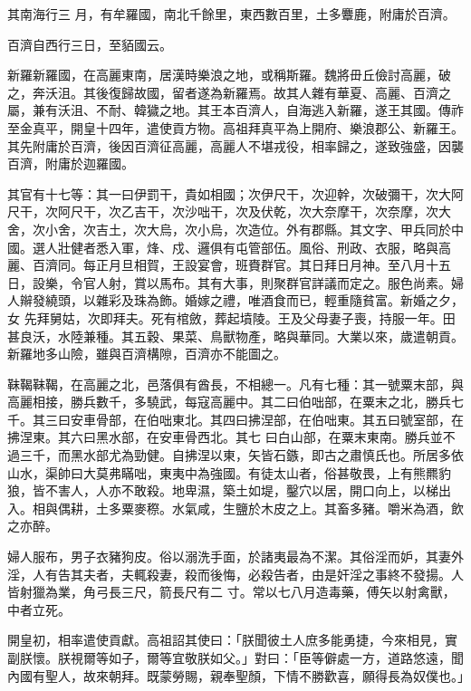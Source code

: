 \begin{pinyinscope}
 其南海行三
 月，有牟羅國，南北千餘里，東西數百里，土多麞鹿，附庸於百濟。



 百濟自西行三日，至貊國云。



 新羅新羅國，在高麗東南，居漢時樂浪之地，或稱斯羅。魏將毌丘儉討高麗，破之，奔沃沮。其後復歸故國，留者遂為新羅焉。故其人雜有華夏、高麗、百濟之屬，兼有沃沮、不耐、韓獩之地。其王本百濟人，自海逃入新羅，遂王其國。傳祚至金真平，開皇十四年，遣使貢方物。高祖拜真平為上開府、樂浪郡公、新羅王。其先附庸於百濟，後因百濟征高麗，高麗人不堪戎役，相率歸之，遂致強盛，因襲
 百濟，附庸於迦羅國。



 其官有十七等：其一曰伊罰干，貴如相國；次伊尺干，次迎幹，次破彌干，次大阿尺干，次阿尺干，次乙吉干，次沙咄干，次及伏乾，次大奈摩干，次奈摩，次大舍，次小舍，次吉土，次大烏，次小烏，次造位。外有郡縣。其文字、甲兵同於中國。選人壯健者悉入軍，烽、戍、邏俱有屯管部伍。風俗、刑政、衣服，略與高麗、百濟同。每正月旦相賀，王設宴會，班賚群官。其日拜日月神。至八月十五日，設樂，令官人射，賞以馬布。其有大事，則聚群官詳議而定之。服色尚素。婦人辮發繞頭，以雜彩及珠為飾。婚嫁之禮，唯酒食而已，輕重隨貧富。新婚之夕，女
 先拜舅姑，次即拜夫。死有棺斂，葬起墳陵。王及父母妻子喪，持服一年。田甚良沃，水陸兼種。其五穀、果菜、鳥獸物產，略與華同。大業以來，歲遣朝貢。新羅地多山險，雖與百濟構隙，百濟亦不能圖之。



 靺鞨靺鞨，在高麗之北，邑落俱有酋長，不相總一。凡有七種：其一號粟末部，與高麗相接，勝兵數千，多驍武，每寇高麗中。其二曰伯咄部，在粟末之北，勝兵七千。其三曰安車骨部，在伯咄東北。其四曰拂涅部，在伯咄東。其五曰號室部，在拂涅東。其六曰黑水部，在安車骨西北。其七
 曰白山部，在粟末東南。勝兵並不過三千，而黑水部尤為勁健。自拂涅以東，矢皆石鏃，即古之肅慎氏也。所居多依山水，渠帥曰大莫弗瞞咄，東夷中為強國。有徒太山者，俗甚敬畏，上有熊羆豹狼，皆不害人，人亦不敢殺。地卑濕，築土如堤，鑿穴以居，開口向上，以梯出入。相與偶耕，土多粟麥穄。水氣咸，生鹽於木皮之上。其畜多豬。嚼米為酒，飲之亦醉。



 婦人服布，男子衣豬狗皮。俗以溺洗手面，於諸夷最為不潔。其俗淫而妒，其妻外淫，人有告其夫者，夫輒殺妻，殺而後悔，必殺告者，由是奸淫之事終不發揚。人皆射獵為業，角弓長三尺，箭長尺有二
 寸。常以七八月造毒藥，傅矢以射禽獸，中者立死。



 開皇初，相率遣使貢獻。高祖詔其使曰：「朕聞彼土人庶多能勇捷，今來相見，實副朕懷。朕視爾等如子，爾等宜敬朕如父。」對曰：「臣等僻處一方，道路悠遠，聞內國有聖人，故來朝拜。既蒙勞賜，親奉聖顏，下情不勝歡喜，願得長為奴僕也。」




\end{pinyinscope}

